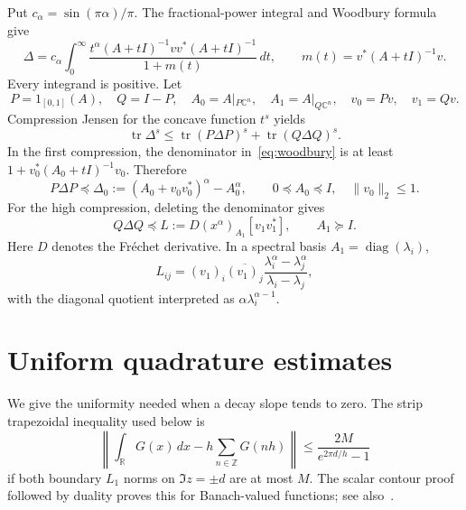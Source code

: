 \documentclass[11pt]{article}
\numberwithin{equation}{section}
\newcommand{\tr}{\operatorname{tr}}
\newcommand{\R}{\mathbb R}
\newcommand{\C}{\mathbb C}
\newcommand{\diag}{\operatorname{diag}}
\begin{document}
Put $c_\alpha=\sin(\pi\alpha)/\pi$. The fractional-power integral and
Woodbury formula give
\begin{equation}\label{eq:woodbury}
 \Delta=c_\alpha\int_0^\infty
 \frac{t^\alpha(A+tI)^{-1}vv^*(A+tI)^{-1}}{1+m(t)}\,dt,
 \qquad m(t)=v^*(A+tI)^{-1}v.
\end{equation}
Every integrand is positive. Let
\[
 P=1_{[0,1]}(A),\quad Q=I-P,\quad
 A_0=A|_{P\C^n},\quad A_1=A|_{Q\C^n},\quad v_0=Pv,\quad v_1=Qv.
\]
Compression Jensen for the concave function $t^s$ yields
\begin{equation}\label{eq:pinching}
 \tr\Delta^s\le\tr(P\Delta P)^s+\tr(Q\Delta Q)^s.
\end{equation}
In the first compression, the denominator in~\eqref{eq:woodbury}
is at least $1+v_0^*(A_0+tI)^{-1}v_0$. Therefore
\begin{equation}\label{eq:lowdom}
 P\Delta P\preceq
 \Delta_0:=(A_0+v_0v_0^*)^\alpha-A_0^\alpha,
 \qquad 0\preceq A_0\preceq I,\quad\|v_0\|_2\le1.
\end{equation}
For the high compression, deleting the denominator gives
\begin{equation}\label{eq:highdom}
 Q\Delta Q\preceq L:=D(x^\alpha)_{A_1}[v_1v_1^*],\qquad A_1\succeq I.
\end{equation}
Here $D$ denotes the Fr\'echet derivative. In a spectral basis
$A_1=\diag(\lambda_i)$,
\begin{equation}\label{eq:loewnerentries}
 L_{ij}=(v_1)_i\overline{(v_1)_j}
 \frac{\lambda_i^\alpha-\lambda_j^\alpha}{\lambda_i-\lambda_j},
\end{equation}
with the diagonal quotient interpreted as $\alpha\lambda_i^{\alpha-1}$.

\section{Uniform quadrature estimates}

We give the uniformity needed when a decay slope tends to zero.
The strip trapezoidal inequality used below is
\begin{equation}\label{eq:trapezoidal}
 \left\|\int_\R G(x)\,dx-h\sum_{n\in\mathbb Z}G(nh)\right\|
 \le\frac{2M}{e^{2\pi d/h}-1}
\end{equation}
if both boundary $L_1$ norms on $\Im z=\pm d$ are at most $M$.
The scalar contour proof followed by duality proves this for
Banach-valued functions; see also~\cite{TW}.
\end{document}

